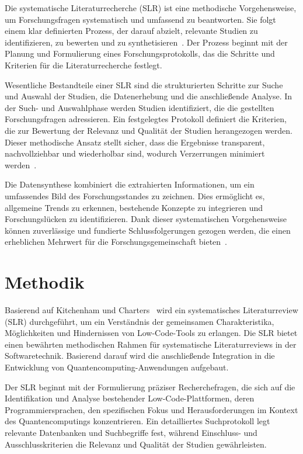 Die systematische Literaturrecherche (SLR) ist eine methodische Vorgehensweise, um Forschungsfragen 
systematisch und umfassend zu beantworten. Sie folgt einem klar definierten Prozess, der darauf abzielt, 
relevante Studien zu identifizieren, zu bewerten und zu synthetisieren~\cite{kitchenham2007guidelines}. 
Der Prozess beginnt mit der Planung und Formulierung eines Forschungsprotokolls, das die Schritte und 
Kriterien für die Literaturrecherche festlegt.

Wesentliche Bestandteile einer SLR sind die strukturierten Schritte zur Suche und Auswahl der Studien, 
die Datenerhebung und die anschließende Analyse. In der Such- und Auswahlphase werden Studien identifiziert, 
die die gestellten Forschungsfragen adressieren. Ein festgelegtes Protokoll definiert die Kriterien, die 
zur Bewertung der Relevanz und Qualität der Studien herangezogen werden. Dieser methodische Ansatz stellt 
sicher, dass die Ergebnisse transparent, nachvollziehbar und wiederholbar sind, wodurch Verzerrungen 
minimiert werden~\cite{okoli2015guide}.

Die Datensynthese kombiniert die extrahierten Informationen, um ein umfassendes Bild des Forschungsstandes 
zu zeichnen. Dies ermöglicht es, allgemeine Trends zu erkennen, bestehende Konzepte zu integrieren und 
Forschungslücken zu identifizieren. Dank dieser systematischen Vorgehensweise können zuverlässige und 
fundierte Schlussfolgerungen gezogen werden, die einen erheblichen Mehrwert für 
die Forschungsgemeinschaft bieten~\cite{petersen2008systematic}.

\section{Methodik}
Basierend auf Kitchenham und Charters~\cite{kitchenham2007guidelines} wird ein systematisches 
Literaturreview (SLR) durchgeführt, um ein Verständnis der gemeinsamen Charakteristika, Möglichkeiten 
und Hindernissen von Low-Code-Tools zu erlangen. Die SLR bietet einen bewährten methodischen 
Rahmen für systematische Literaturreviews in der Softwaretechnik. Basierend darauf wird die 
anschließende Integration in die Entwicklung von Quantencomputing-Anwendungen aufgebaut.

Der SLR beginnt mit der Formulierung präziser Recherchefragen, die sich auf die 
Identifikation und Analyse bestehender Low-Code-Plattformen, deren Programmiersprachen, 
den spezifischen Fokus und Herausforderungen im Kontext des Quantencomputings 
konzentrieren. Ein detailliertes Suchprotokoll legt relevante Datenbanken und 
Suchbegriffe fest, während Einschluss- und Ausschlusskriterien die Relevanz und Qualität 
der Studien gewährleisten.

